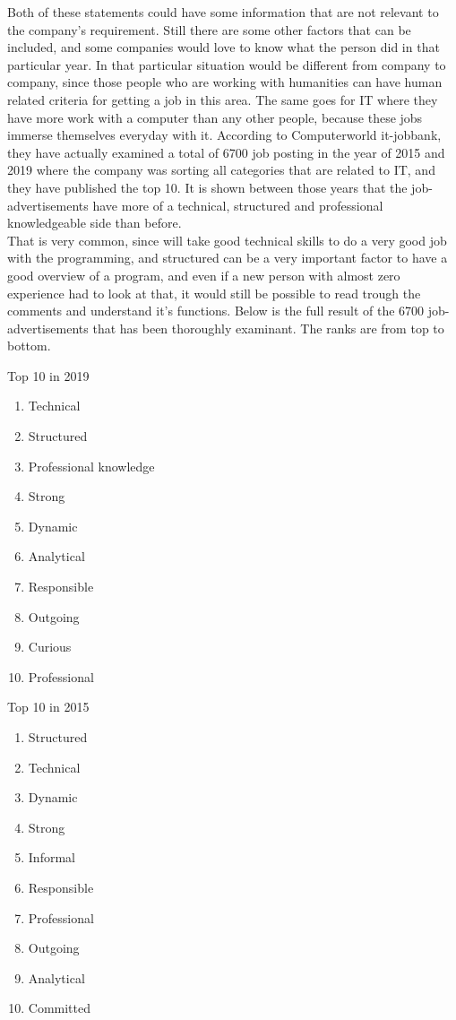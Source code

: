 Both of these statements could have some information that are not relevant to the company's requirement. Still there are some other
factors that can be included, and some companies would love to know what the person did in that particular year.
In that particular situation would be different from company to company, since those people who are working with humanities
can have human related criteria for getting a job in this area. The same goes for IT where they have more work with a computer
than any other people, because these jobs immerse themselves everyday with it. According to Computerworld it-jobbank,
they have actually examined a total of 6700 job posting in the year of 2015 and 2019 where the company was sorting all categories
that are related to IT, and they have published the top 10. It is shown between those years that the job-advertisements
have more of a technical, structured and professional knowledgeable side than before.\cite{10_personal_skills} \\

That is very common, since will take good technical skills to do a very good job with the programming,
and structured can be a very important factor to have a good overview of a program,
and even if a new person with almost zero experience had to look at that,
it would still be possible to read trough the comments and understand it's functions. Below is the full result
of the 6700 job-advertisements that has been thoroughly examinant. The ranks are from top to bottom.

\newpage
Top 10 in 2019
\begin{enumerate}

\item Technical
\item Structured
\item Professional knowledge
\item Strong
\item Dynamic
\item Analytical
\item Responsible
\item Outgoing
\item Curious
\item Professional
\end{enumerate}

Top 10 in 2015
\begin{enumerate}

\item Structured
\item Technical
\item Dynamic
\item Strong
\item Informal
\item Responsible
\item Professional
\item Outgoing
\item Analytical
\item Committed
\end{enumerate} \clearpage

